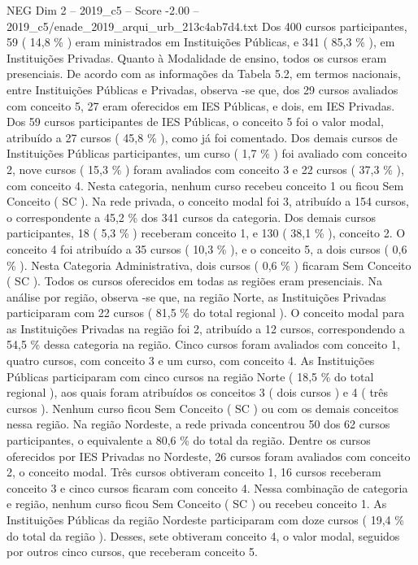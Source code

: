 \begin{textsample}{NEG Dim 2 – 2019\_c5 – Score -2.00 – 2019\_c5/enade\_2019\_arqui\_urb\_213c4ab7d4.txt}
Dos 400 cursos participantes, 59 ( 14,8 \% ) eram ministrados em Instituições Públicas, e 341 ( 85,3 \% ), em Instituições Privadas.
Quanto à Modalidade de ensino, todos os cursos eram presenciais.
De acordo com as informações da Tabela 5.2, em termos nacionais, entre Instituições Públicas e Privadas, observa -se que, dos 29 cursos avaliados com conceito 5, 27 eram oferecidos em IES Públicas, e dois, em IES Privadas.
Dos 59 cursos participantes de IES Públicas, o conceito 5 foi o valor modal, atribuído a 27 cursos ( 45,8 \% ), como já foi comentado.
Dos demais cursos de Instituições Públicas participantes, um curso ( 1,7 \% ) foi avaliado com conceito 2, nove cursos ( 15,3 \% ) foram avaliados com conceito 3 e 22 cursos ( 37,3 \% ), com conceito 4.
Nesta categoria, nenhum curso recebeu conceito 1 ou ficou Sem Conceito ( SC ).
Na rede privada, o conceito modal foi 3, atribuído a 154 cursos, o correspondente a 45,2 \% dos 341 cursos da categoria.
Dos demais cursos participantes, 18 ( 5,3 \% ) receberam conceito 1, e 130 ( 38,1 \% ), conceito 2.
O conceito 4 foi atribuído a 35 cursos ( 10,3 \% ), e o conceito 5, a dois cursos ( 0,6 \% ).
Nesta Categoria Administrativa, dois cursos ( 0,6 \% ) ficaram Sem Conceito ( SC ).
Todos os cursos oferecidos em todas as regiões eram presenciais.
Na análise por região, observa -se que, na região Norte, as Instituições Privadas participaram com 22 cursos ( 81,5 \% do total regional ).
O conceito modal para as Instituições Privadas na região foi 2, atribuído a 12 cursos, correspondendo a 54,5 \% dessa categoria na região.
Cinco cursos foram avaliados com conceito 1, quatro cursos, com conceito 3 e um curso, com conceito 4.
As Instituições Públicas participaram com cinco cursos na região Norte ( 18,5 \% do total regional ), aos quais foram atribuídos os conceitos 3 ( dois cursos ) e 4 ( três cursos ).
Nenhum curso ficou Sem Conceito ( SC ) ou com os demais conceitos nessa região.
Na região Nordeste, a rede privada concentrou 50 dos 62 cursos participantes, o equivalente a 80,6 \% do total da região.
Dentre os cursos oferecidos por IES Privadas no Nordeste, 26 cursos foram avaliados com conceito 2, o conceito modal.
Três cursos obtiveram conceito 1, 16 cursos receberam conceito 3 e cinco cursos ficaram com conceito 4.
Nessa combinação de categoria e região, nenhum curso ficou Sem Conceito ( SC ) ou recebeu conceito 1.
As Instituições Públicas da região Nordeste participaram com doze cursos ( 19,4 \% do total da região ).
Desses, sete obtiveram conceito 4, o valor modal, seguidos por outros cinco cursos, que receberam conceito 5.

\end{textsample}
